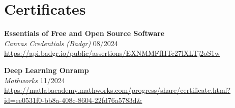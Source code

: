 \section*{Certificates}
\textbf{Essentials of Free and Open Source Software}\\
\textit{Canvas Credentials (Badgr)} \hfill 08/2024\\
\url{https://api.badgr.io/public/assertions/EXNMMFfHTc27lXLTj2oS1w}

\textbf{Deep Learning Onramp}\\
\textit{Mathworks} \hfill 11/2024\\
\url{https://matlabacademy.mathworks.com/progress/share/certificate.html?id=ee0531f0-bb8a-408c-8604-22fd76a5783d&}